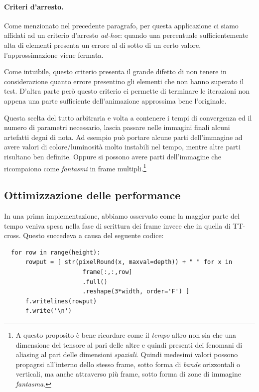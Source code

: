 \documentclass[11pt,a4paper]{article}
\begin{document}
\paragraph{Criteri d'arresto.}
Come menzionato nel precedente paragrafo, per questa applicazione ci siamo affidati ad un criterio d'arresto \emph{ad-hoc}: quando una percentuale sufficientemente alta di elementi presenta un errore al di sotto di un certo valore, l'approssimazione viene fermata.

Come intuibile, questo criterio presenta il grande difetto di non tenere in considerazione quanto errore presentino gli elementi che non hanno superato il test.
D'altra parte però questo criterio ci permette di terminare le iterazioni non appena una parte sufficiente dell'animazione approssima bene l'originale.

Questa scelta del tutto arbitraria e volta a contenere i tempi di convergenza ed il numero di parametri necessario, lascia passare nelle immagini finali alcuni artefatti degni di nota. Ad esempio può portare alcune parti dell'immagine ad avere valori di colore/luminosità molto instabili nel tempo, mentre altre parti risultano ben definite. Oppure si possono avere parti dell'immagine che ricompaiono come \emph{fantasmi} in frame  multipli.\footnote{A questo proposito è bene ricordare come il \emph{tempo} altro non sia che una dimensione del tensore al pari delle altre e quindi presenti dei fenomani di aliasing al pari delle dimensioni \emph{spaziali}. Quindi medesimi valori possono propagrsi all'interno dello stesso frame, sotto forma di \emph{bande} orizzontali o verticali, ma anche attraverso più frame, sotto forma di zone di immagine \emph{fantasma}.}

\subsection{Ottimizzazione delle performance}
In una prima implementazione,  abbiamo osservato come la maggior parte del tempo veniva spesa nella fase di scrittura dei frame invece che in quella di TT-cross.
Questo succedeva a causa del seguente codice: 

\begin{lstlisting}
  for row in range(height):
      rowput = [ str(pixelRound(x, maxval=depth)) + " " for x in 
                      frame[:,:,row]
                      .full()
                      .reshape(3*width, order='F') ]
      f.writelines(rowput)
      f.write('\n')
\end{lstlisting}
\end{document}
